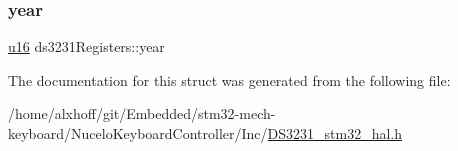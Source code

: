 \mbox{\label{structds3231Registers_a671343dd45a75d94e122178d71e3a3a9}} 
\subsubsection{\texorpdfstring{year}{year}}
{\footnotesize\ttfamily \hyperlink{main_8h_a2b19d553290a8d4a083d3c03280ea800}{u16} ds3231\+Registers\+::year}



The documentation for this struct was generated from the following file\+:\begin{DoxyCompactItemize}
\item 
/home/alxhoff/git/\+Embedded/stm32-\/mech-\/keyboard/\+Nucelo\+Keyboard\+Controller/\+Inc/\hyperlink{DS3231__stm32__hal_8h}{D\+S3231\+\_\+stm32\+\_\+hal.\+h}\end{DoxyCompactItemize}
